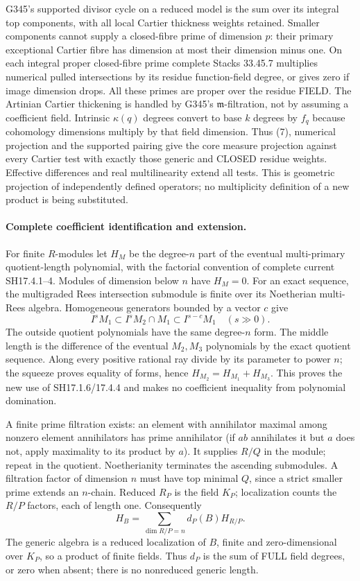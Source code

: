 \documentclass[11pt]{article}
\begin{document}
G345's supported divisor cycle on a reduced model is the sum over its integral top components, with all local Cartier thickness weights retained. Smaller components cannot supply a closed-fibre prime of dimension $p$: their primary exceptional Cartier fibre has dimension at most their dimension minus one. On each integral proper closed-fibre prime complete Stacks 33.45.7 multiplies numerical pulled intersections by its residue function-field degree, or gives zero if image dimension drops. All these primes are proper over the residue FIELD. The Artinian Cartier thickening is handled by G345's $\mathfrak m$-filtration, not by assuming a coefficient field. Intrinsic $\kappa(q)$ degrees convert to base $k$ degrees by $f_q$ because cohomology dimensions multiply by that field dimension. Thus (7), numerical projection and the supported pairing give the core measure projection against every Cartier test with exactly those generic and CLOSED residue weights. Effective differences and real multilinearity extend all tests. This is geometric projection of independently defined operators; no multiplicity definition of a new product is being substituted.

\paragraph{Complete coefficient identification and extension.}
For finite $R$-modules let $H_M$ be the degree-$n$ part of the eventual multi-primary quotient-length polynomial, with the factorial convention of complete current SH17.4.1--4. Modules of dimension below $n$ have $H_M=0$. For an exact sequence, the multigraded Rees intersection submodule is finite over its Noetherian multi-Rees algebra. Homogeneous generators bounded by a vector $c$ give
\[
 I^sM_1\subset I^sM_2\cap M_1\subset I^{s-c}M_1\quad(s\gg0).
\]
The outside quotient polynomials have the same degree-$n$ form. The middle length is the difference of the eventual $M_2,M_3$ polynomials by the exact quotient sequence. Along every positive rational ray divide by its parameter to power $n$; the squeeze proves equality of forms, hence $H_{M_2}=H_{M_1}+H_{M_3}$. This proves the new use of SH17.1.6/17.4.4 and makes no coefficient inequality from polynomial domination.

A finite prime filtration exists: an element with annihilator maximal among nonzero element annihilators has prime annihilator (if $ab$ annihilates it but $a$ does not, apply maximality to its product by $a$). It supplies $R/Q$ in the module; repeat in the quotient. Noetherianity terminates the ascending submodules. A filtration factor of dimension $n$ must have top minimal $Q$, since a strict smaller prime extends an $n$-chain. Reduced $R_P$ is the field $K_P$; localization counts the $R/P$ factors, each of length one. Consequently
\[
 H_B=\sum_{\dim R/P=n}d_P(B)H_{R/P}. \tag{8}
\]
The generic algebra is a reduced localization of $B$, finite and zero-dimensional over $K_P$, so a product of finite fields. Thus $d_P$ is the sum of FULL field degrees, or zero when absent; there is no nonreduced generic length.
\end{document}
